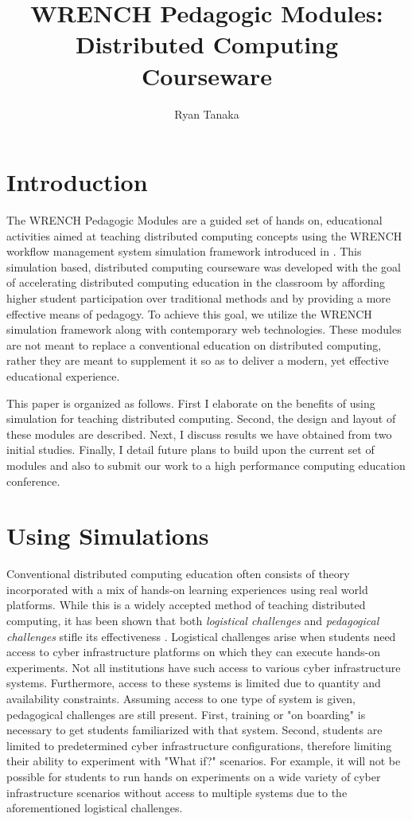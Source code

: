 \documentclass{article} \usepackage{indentfirst}
\begin{document}
\title{WRENCH Pedagogic Modules: Distributed Computing Courseware} \author{Ryan
Tanaka}

\maketitle

\section{Introduction} The WRENCH Pedagogic Modules are a guided set of hands
on, educational activities aimed at teaching distributed computing concepts
using the WRENCH workflow management system simulation framework introduced in
\cite{wrench}. This simulation based, distributed computing courseware was
developed with the goal of accelerating distributed computing education in the
classroom by affording higher student participation over traditional methods and
by providing a more effective means of pedagogy. To achieve this goal, we
utilize the WRENCH simulation framework along with contemporary web
technologies. These modules are not meant to replace a conventional education on
distributed computing, rather they are meant to supplement it so as to deliver a
modern, yet effective educational  experience.

This paper is organized as follows. First I elaborate on the benefits of using
simulation for teaching  distributed computing. Second, the design and layout of
these modules are described. Next, I discuss results we have obtained from two
initial studies. Finally, I detail future plans to build upon the current set of
modules and also to submit our work to a high performance computing education
conference.

\section{Using Simulations} Conventional distributed computing education often
consists of theory incorporated with a mix of hands-on learning experiences
using real world platforms. While this is a widely accepted method of teaching
distributed computing, it has been shown that both \textit{logistical
challenges} and \textit{pedagogical challenges} stifle its effectiveness
\cite{smpi-courseware}. Logistical challenges arise when students need access to
cyber infrastructure platforms on which they can execute hands-on experiments.
Not all institutions have such access to various  cyber infrastructure systems.
Furthermore, access to these systems is limited due to quantity and availability
constraints. Assuming access to one type of system is given, pedagogical
challenges are still present. First, training or "on boarding" is necessary to
get students familiarized with that system. Second, students are limited to
predetermined cyber infrastructure configurations, therefore limiting their
ability to experiment with "What if?" scenarios. For example, it will not be
possible for students to  run hands on experiments on a wide variety of cyber
infrastructure scenarios without access to multiple systems due to the
aforementioned  logistical challenges.
\end{document}
